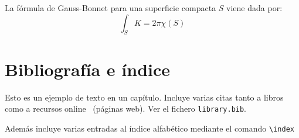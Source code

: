 La fórmula de Gauss-Bonnet para una superficie compacta $S$ viene dada por:
\begin{equation}
  \int_S K = 2\pi\chi(S)
\end{equation}


\section{Bibliografía e índice}

Esto es un ejemplo de texto en un capítulo. Incluye varias citas tanto a libros~\cite{Euler1982, Euler1984, Euler1985} como a recursos online~\cite{EulerWiki} (páginas web). Ver el fichero \texttt{library.bib}.

Además incluye varias entradas al índice alfabético mediante el comando \verb+\index+ 


\endinput
